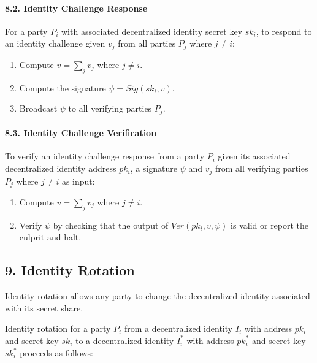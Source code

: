 \documentclass[
]{article}
\providecommand{\tightlist}{%
  \setlength{\itemsep}{0pt}\setlength{\parskip}{0pt}}
\begin{document}
\hypertarget{identity-challenge-response}{%
\paragraph{8.2. Identity Challenge
Response}\label{identity-challenge-response}}

For a party \(P_i\) with associated decentralized identity secret key
\(sk_i\), to respond to an identity challenge given \(v_j\) from all
parties \(P_j\) where \(j \neq i\):

\begin{enumerate}
\def\labelenumi{\arabic{enumi}.}
\tightlist
\item
  Compute \(v = \sum _j v_j\) where \(j \neq i\).
\item
  Compute the signature \(\psi = Sig(sk_i, v)\).
\item
  Broadcast \(\psi\) to all verifying parties \(P_j\).
\end{enumerate}

\hypertarget{identity-challenge-verification}{%
\paragraph{8.3. Identity Challenge
Verification}\label{identity-challenge-verification}}

To verify an identity challenge response from a party \(P_i\) given its
associated decentralized identity address \(pk_i\), a signature \(\psi\)
and \(v_j\) from all verifying parties \(P_j\) where \(j \neq i\) as
input:

\begin{enumerate}
\def\labelenumi{\arabic{enumi}.}
\tightlist
\item
  Compute \(v = \sum _j v_j\) where \(j \neq i\).
\item
  Verify \(\psi\) by checking that the output of \(Ver(pk_i, v, \psi)\)
  is valid or report the culprit and halt.
\end{enumerate}

\hypertarget{identity-rotation}{%
\subsection{9. Identity Rotation}\label{identity-rotation}}

Identity rotation allows any party to change the decentralized identity
associated with its secret share.

Identity rotation for a party \(P_i\) from a decentralized identity
\(I_i\) with address \(pk_i\) and secret key \(sk_i\) to a decentralized
identity \(I_i^ \ast\) with address \(pk_i^ \ast\) and secret key
\(sk_i^ \ast\) proceeds as follows:
\end{document}
